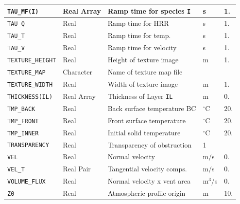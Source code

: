 \documentclass[11pt]{book}
\newcommand{\ct}{\tt\small}
\begin{document}
\begin{longtable}{|l|l|l|l|l|}
{\ct TAU\_MF(I)}                      & Real Array      & Ramp time for species {\ct I}     & s                   & 1.     \\ \hline
{\ct TAU\_Q}                          & Real            & Ramp time for HRR                 & s                   & 1.     \\ \hline
{\ct TAU\_T}                          & Real            & Ramp time for temp.               & s                   & 1.     \\ \hline
{\ct TAU\_V}                          & Real            & Ramp time for velocity            & s                   & 1.     \\ \hline
{\ct TEXTURE\_HEIGHT}                 & Real            & Height of texture image           & m                   & 1.     \\ \hline
{\ct TEXTURE\_MAP}                    & Character       & Name of texture map file          &                     &        \\ \hline
{\ct TEXTURE\_WIDTH}                  & Real            & Width of texture image            & m                   & 1.     \\ \hline
{\ct THICKNESS(IL)}                   & Real Array      & Thickness of Layer {\ct IL}       & m                   & 0.    \\ \hline
{\ct TMP\_BACK}                       & Real            & Back surface temperature BC       & $^\circ$C           & 20.    \\ \hline
{\ct TMP\_FRONT}                      & Real            & Front surface temperature         & $^\circ$C           & 20.    \\ \hline
{\ct TMP\_INNER}                      & Real            & Initial solid temperature         & $^\circ$C           & 20.    \\ \hline
{\ct TRANSPARENCY}                    & Real            & Transparency of obstruction       &    1                &           \\ \hline
{\ct VEL    }                         & Real            & Normal velocity                   & m/s                 & 0.     \\ \hline
{\ct VEL\_T }                         & Real Pair       & Tangential velocity comps.        & m/s                 & 0.     \\ \hline
{\ct VOLUME\_FLUX}                    & Real            & Normal velocity x vent area       & m$^3$/s             & 0.     \\ \hline
{\ct Z0 }                             & Real            & Atmospheric profile origin        &  m                  & 10.    \\ \hline
\end{longtable}
\end{document}
